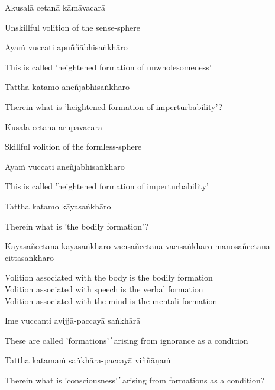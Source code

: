 Akusalā cetanā kāmāvacarā

\begin{cprenglish}
Unskillful volition of the sense-sphere
\end{cprenglish}

Ayaṁ vuccati apuññābhisaṅkhāro

\begin{cprenglish}
This is called 'heightened formation of unwholesomeness'
\end{cprenglish}

Tattha katamo āneñjābhisaṅkhāro

\begin{cprenglish}
Therein what is 'heightened formation of imperturbability'?
\end{cprenglish}

Kusalā cetanā arūpāvacarā

\begin{cprenglish}
Skillful volition of the formless-sphere
\end{cprenglish}

Ayaṁ vuccati āneñjābhisaṅkhāro

\begin{cprenglish}
This is called 'heightened formation of imperturbability'
\end{cprenglish}

Tattha katamo kāyasaṅkhāro

\begin{cprenglish}
Therein what is 'the bodily formation'?
\end{cprenglish}

Kāyasañcetanā kāyasaṅkhāro vacīsañcetanā vacīsaṅkhāro manosañcetanā cittasaṅkhāro

\begin{cprenglish}
Volition associated with the body is the bodily formation\\
Volition associated with speech is the verbal formation\\
Volition associated with the mind is the mentali formation
\end{cprenglish}

Ime vuccanti avijjā-paccayā saṅkhārā

\begin{cprenglish}
These are called 'formations'  ̓  arising from ignorance as a condition
\end{cprenglish}

Tattha katamaṁ saṅkhāra-paccayā viññāṇaṁ

\begin{cprenglish}
Therein what is 'consciousness'  ̓  arising from formations as a condition?
\end{cprenglish}

